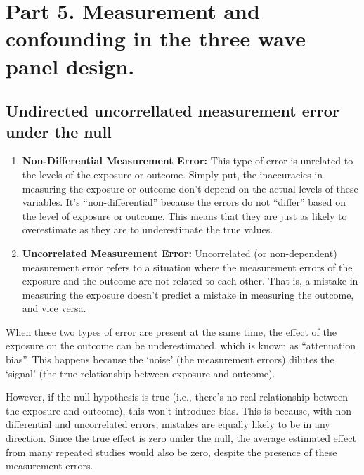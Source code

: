 \documentclass[
  singlecolumn]{report}
\begin{document}
\hypertarget{part-5.-measurement-and-confounding-in-the-three-wave-panel-design.}{%
\section{Part 5. Measurement and confounding in the three wave panel
design.}\label{part-5.-measurement-and-confounding-in-the-three-wave-panel-design.}}

\hypertarget{undirected-uncorrellated-measurement-error-under-the-null}{%
\subsection{Undirected uncorrellated measurement error under the
null}\label{undirected-uncorrellated-measurement-error-under-the-null}}

\begin{enumerate}
\def\labelenumi{\arabic{enumi}.}
\item
  \textbf{Non-Differential Measurement Error:} This type of error is
  unrelated to the levels of the exposure or outcome. Simply put, the
  inaccuracies in measuring the exposure or outcome don't depend on the
  actual levels of these variables. It's ``non-differential'' because
  the errors do not ``differ'' based on the level of exposure or
  outcome. This means that they are just as likely to overestimate as
  they are to underestimate the true values.
\item
  \textbf{Uncorrelated Measurement Error:} Uncorrelated (or
  non-dependent) measurement error refers to a situation where the
  measurement errors of the exposure and the outcome are not related to
  each other. That is, a mistake in measuring the exposure doesn't
  predict a mistake in measuring the outcome, and vice versa.
\end{enumerate}

When these two types of error are present at the same time, the effect
of the exposure on the outcome can be underestimated, which is known as
``attenuation bias''. This happens because the `noise' (the measurement
errors) dilutes the `signal' (the true relationship between exposure and
outcome).

However, if the null hypothesis is true (i.e., there's no real
relationship between the exposure and outcome), this won't introduce
bias. This is because, with non-differential and uncorrelated errors,
mistakes are equally likely to be in any direction. Since the true
effect is zero under the null, the average estimated effect from many
repeated studies would also be zero, despite the presence of these
measurement errors.
\end{document}
